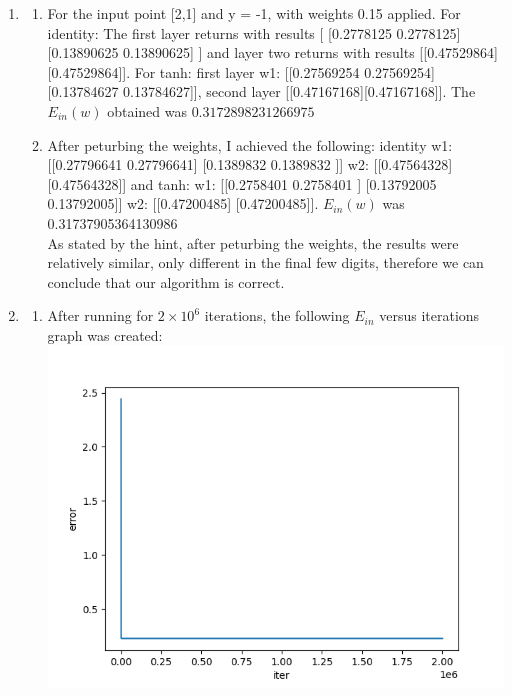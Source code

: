\documentclass{article}
\begin{document}
    \begin{enumerate}
        \item \begin{enumerate}[label=(\alph*)]
            \item For the input point [2,1] and y = -1, with weights 0.15 applied. For identity: The first layer returns with results [ [0.2778125  0.2778125] [0.13890625 0.13890625] ] and layer two returns with results [[0.47529864] [0.47529864]]. For tanh: first layer w1: [[0.27569254 0.27569254][0.13784627 0.13784627]], second layer [[0.47167168][0.47167168]]. The $E_{in}(w)$ obtained was $0.3172898231266975$
            \item After peturbing the weights, I achieved the following: identity w1: [[0.27796641 0.27796641]
            [0.1389832  0.1389832 ]]
           w2: [[0.47564328]
            [0.47564328]] and tanh: w1: [[0.2758401  0.2758401 ]
            [0.13792005 0.13792005]]
           w2: [[0.47200485]
            [0.47200485]]. $E_{in}(w)$ was 0.31737905364130986\\[0.25in]
            As stated by the hint, after peturbing the weights, the results were relatively similar, only different in the final few digits, therefore we can conclude that our algorithm is correct.
        \end{enumerate}
        \item \begin{enumerate}
            \item After running for $2 \times 10^6$ iterations, the following $E_{in}$ versus iterations graph was created:\\\includegraphics[scale=0.5]{images/2a1.png}\\

\end{enumerate}
\end{enumerate}
\end{document}
